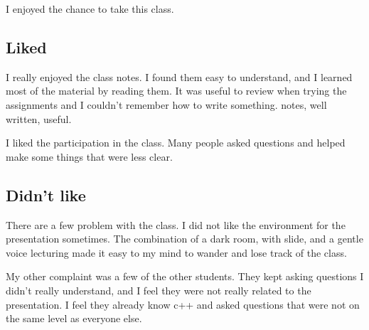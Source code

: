 \documentclass[12pt]{article}
\begin{document}
I enjoyed the chance to take this class.

\subsection{Liked}
I really enjoyed the class notes.  I found them easy to understand, and I
learned most of the material by reading them.  It was useful to review when
trying the assignments and I couldn't remember how to write something.
notes, well written, useful.

I liked the participation in the class.  Many people asked questions and helped
make some things that were less clear.

\subsection{Didn't like}

There are a few problem with the class.  I did not like the environment for the
presentation sometimes.  The combination of a dark room, with slide, and a
gentle voice lecturing made it easy to my mind to wander and lose track of the
class.

My other complaint was a few of the other students.  They kept asking questions
I didn't really understand, and I feel they were not really related to the
presentation.  I feel they already know c++ and asked questions that were not
on the same level as everyone else.
\end{document}
